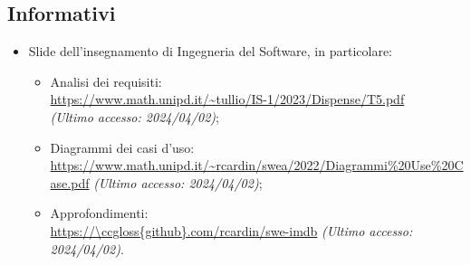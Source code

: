 \subsection{Informativi}
\begin{itemize}
    \item Slide dell’insegnamento di Ingegneria del Software, in particolare:
        \begin{itemize}
            \item Analisi dei requisiti: \\ \url{https://www.math.unipd.it/~tullio/IS-1/2023/Dispense/T5.pdf}\\ \textit{(Ultimo accesso: 2024/04/02)};
            \item Diagrammi dei casi d'uso:\\ \url{https://www.math.unipd.it/~rcardin/swea/2022/Diagrammi%20Use%20Case.pdf} \textit{(Ultimo accesso: 2024/04/02)};
            \item Approfondimenti:\\ \url{https://\ccgloss{github}.com/rcardin/swe-imdb} \textit{(Ultimo accesso: 2024/04/02)}.
        \end{itemize}
\end{itemize}
